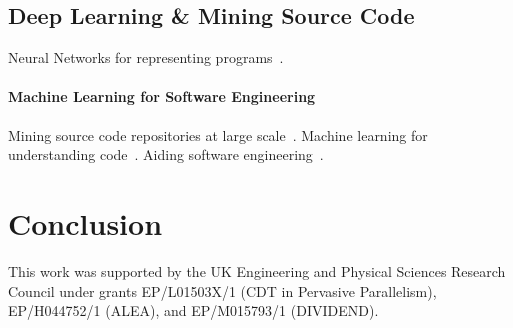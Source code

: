 \documentclass[preprint,nonatbib,10pt,nocopyrightspace]{sigplanconf}
\begin{document}
\subsection{Deep Learning \& Mining Source Code}

Neural Networks for representing programs~\cite{Bunel}.

\paragraph{Machine Learning for Software Engineering} Mining source
code repositories at large
scale~\cite{Allamanis2013a,White2015a}. Machine learning for
understanding code~\cite{Allamanis2014a,Raychev}. Aiding software
engineering~\cite{Allamanis2014,Bird2015}.


\section{Conclusion}\label{sec:conclusion}



\acks

This work was supported by the UK Engineering and Physical Sciences
Research Council under grants EP/L01503X/1 (CDT in Pervasive
Parallelism), EP/H044752/1 (ALEA), and EP/M015793/1 (DIVIDEND).


\label{bibliography}
\printbibliography
\end{document}
